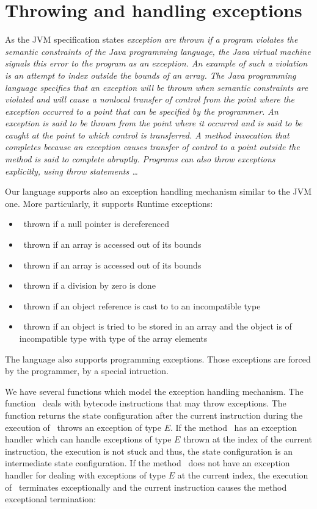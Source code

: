 \section{Throwing and handling exceptions}

As the JVM specification states \textit{exception are thrown if a program violates the semantic constraints of the Java programming language,
 the Java virtual machine signals this error to the program as an exception. An example of such a violation is an 
attempt to index outside the bounds of an array. The Java programming language specifies that an exception will be thrown when
 semantic constraints are violated and will cause a nonlocal transfer of control from the point where the exception occurred to
 a point that can be specified by the programmer. An exception is said to be thrown from the point where it occurred and is said to be
 caught at the point to which control is transferred. A method invocation that completes because an exception causes transfer of
 control to a point outside the method is said to complete abruptly. Programs can also throw exceptions explicitly, using throw statements \ldots }

Our language supports also an exception handling mechanism similar to the JVM one.
 More particularly, it supports Runtime exceptions: 
 \begin{itemize}
   \item \NullPointerExc \ thrown if a null pointer is dereferenced
   \item \NegativeArraySizeExc \ thrown if an array is accessed out of its bounds
   \item \ArrIndexOutOfBoundExc \ thrown if an array is accessed out of its bounds
   \item \ArithExc \ thrown if a division by zero is done
   \item \ClassCastExc \ thrown if an object reference is cast to to an incompatible type
   \item \ArrStoreExc \ thrown if an object is tried to be stored in an array and the object is of incompatible type with type of the  array elements
\end{itemize}

The language also supports programming exceptions. Those exceptions are forced by the programmer, by a special intruction.

We have several functions which model the exception handling mechanism. 
 The function \getStateAfterExc \ deals with bytecode instructions that may throw exceptions. The function returns the state 
 configuration after the current instruction during the execution of \methodd \ throws an exception of type $E$. If the  method
 \methodd \ has an  exception handler which can handle  exceptions of type $E$ thrown at the index of the current  instruction,
 the execution is not stuck and thus, the state configuration is an intermediate state configuration.
 If the method \methodd \ does not have an exception handler for dealing with exceptions of type $E$ 
 at the current index, the execution of \methodd \ terminates exceptionally and the current instruction
 causes the method exceptional termination:

